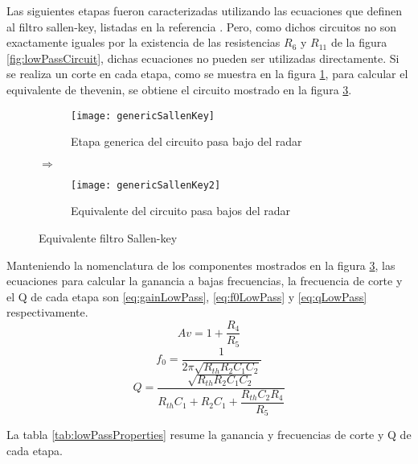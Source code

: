 Las siguientes etapas fueron caracterizadas utilizando las ecuaciones que definen al filtro sallen-key, listadas en la referencia \cite{Unwin2003}. Pero, como dichos circuitos no son exactamente iguales por la existencia de las resistencias $R_6$ y $R_{11}$ de la figura \ref{fig:lowPassCircuit}, dichas ecuaciones no pueden ser utilizadas directamente. Si se realiza un corte en cada etapa, como se muestra en la figura \ref{fig:genericSallen}, para calcular el equivalente de thevenin, se obtiene el circuito mostrado en la figura \ref{fig:genericSallen2}.

\begin{figure}
  \centering
  \begin{subfigure}{0.4\textwidth}
    \texttt{[image: genericSallenKey]}
    \caption{Etapa generica del circuito pasa bajo del radar}
    \label{fig:genericSallen}   
  \end{subfigure}
  {\color{blue}\LARGE$\Rightarrow$}
  \begin{subfigure}{0.4\textwidth}
    \texttt{[image: genericSallenKey2]}
    \caption{Equivalente del circuito pasa bajos del radar}
    \label{fig:genericSallen2}
  \end{subfigure}             
  \caption{Equivalente filtro Sallen-key}
\end{figure}
Manteniendo la nomenclatura de los componentes mostrados en la figura \ref{fig:genericSallen2}, las ecuaciones para calcular la ganancia a bajas frecuencias, la frecuencia de corte y el Q de cada etapa son \ref{eq:gainLowPass}, \ref{eq:f0LowPass} y \ref{eq:qLowPass} respectivamente.
\begin{equation}\label{eq:gainLowPass}
  Av = 1 + \dfrac{R_4}{R_5}
\end{equation}
\begin{equation}\label{eq:f0LowPass}
  f_0 = \dfrac{1}{2\pi\sqrt{R_{th}R_2C_1C_2}}
\end{equation}
\begin{equation}\label{eq:qLowPass}
  Q = \dfrac{\sqrt{R_{th}R_2C_1C_2}}{R_{th}C_1 + R_2C_1 + \dfrac{R_{th}C_2R_4}{R_5}}
\end{equation}

La tabla \ref{tab:lowPassProperties} resume la ganancia y frecuencias de corte y Q de cada etapa.


